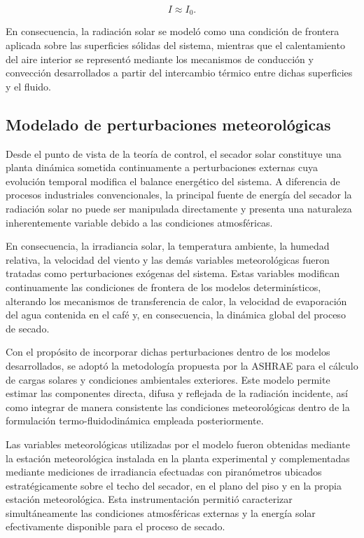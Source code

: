 \begin{equation}
I \approx I_0.
\end{equation}

En consecuencia, la radiación solar se modeló como una condición de frontera aplicada sobre las superficies sólidas del sistema, mientras que el calentamiento del aire interior se representó mediante los mecanismos de conducción y convección desarrollados a partir del intercambio térmico entre dichas superficies y el fluido.

\subsection{Modelado de perturbaciones meteorológicas}

Desde el punto de vista de la teoría de control, el secador solar constituye una planta dinámica sometida continuamente a perturbaciones externas cuya evolución temporal modifica el balance energético del sistema. A diferencia de procesos industriales convencionales, la principal fuente de energía del secador la radiación solar no puede ser manipulada directamente y presenta una naturaleza inherentemente variable debido a las condiciones atmosféricas.

En consecuencia, la irradiancia solar, la temperatura ambiente, la humedad relativa, la velocidad del viento y las demás variables meteorológicas fueron tratadas como perturbaciones exógenas del sistema. Estas variables modifican continuamente las condiciones de frontera de los modelos determinísticos, alterando los mecanismos de transferencia de calor, la velocidad de evaporación del agua contenida en el café y, en consecuencia, la dinámica global del proceso de secado.

Con el propósito de incorporar dichas perturbaciones dentro de los modelos desarrollados, se adoptó la metodología propuesta por la ASHRAE para el cálculo de cargas solares y condiciones ambientales exteriores. Este modelo permite estimar las componentes directa, difusa y reflejada de la radiación incidente, así como integrar de manera consistente las condiciones meteorológicas dentro de la formulación termo-fluidodinámica empleada posteriormente.

Las variables meteorológicas utilizadas por el modelo fueron obtenidas mediante la estación meteorológica instalada en la planta experimental y complementadas mediante mediciones de irradiancia efectuadas con piranómetros ubicados estratégicamente sobre el techo del secador, en el plano del piso y en la propia estación meteorológica. Esta instrumentación permitió caracterizar simultáneamente las condiciones atmosféricas externas y la energía solar efectivamente disponible para el proceso de secado.

